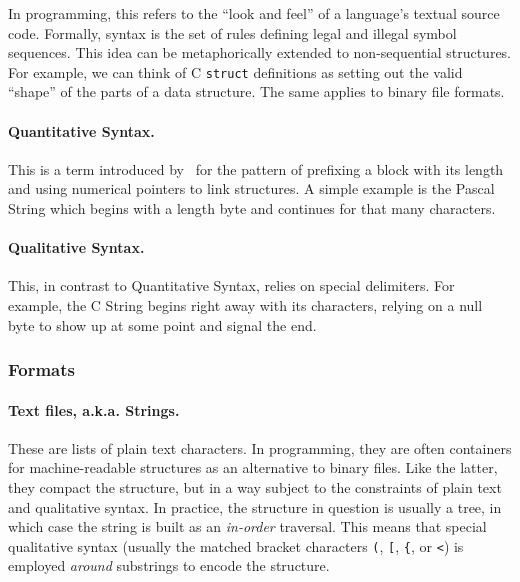 In programming, this refers to the ``look and feel'' of a language's
textual source code. Formally, syntax is the set of rules defining legal
and illegal symbol sequences. This idea can be metaphorically extended
to non-sequential structures. For example, we can think of C
\texttt{struct} definitions as setting out the valid ``shape'' of the
parts of a data structure. The same applies to binary file formats.

\paragraph{Quantitative Syntax.}

This is a term introduced by~\cite[p.\ 13]{Infra} for the pattern of
prefixing a block with its length and using numerical pointers to link
structures. A simple example is the Pascal String which begins with a
length byte and continues for that many characters.

\paragraph{Qualitative Syntax.}

This, in contrast to Quantitative Syntax, relies on special delimiters.
For example, the C String begins right away with its characters, relying
on a null byte to show up at some point and signal the end.

\hypertarget{formats}{%
\subsubsection{Formats}\label{formats}}

\paragraph{Text files, a.k.a. Strings.}

These are lists of plain text characters. In programming, they are often
containers for machine-readable structures as an alternative to binary
files. Like the latter, they compact the structure, but in a way subject
to the constraints of plain text and qualitative syntax. In practice,
the structure in question is usually a tree, in which case the string is
built as an \emph{in-order} traversal. This means that special
qualitative syntax (usually the matched bracket characters \texttt{(},
\texttt{{[}}, \texttt{\{}, or \texttt{\textless{}}) is employed
\emph{around} substrings to encode the structure.

